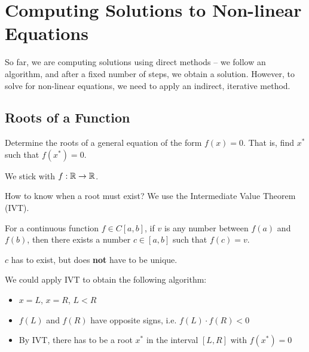 \chapter{Computing Solutions to Non-linear Equations}

So far, we are computing solutions using direct methods -- we follow an algorithm, and after a fixed number of steps, we obtain a solution. However, to solve for non-linear equations, we need to apply an indirect, iterative method.

\section{Roots of a Function}

Determine the roots of a general equation of the form \( f(x) = 0 \). That is, find \( x^\ast \) such that \( f(x^\ast) = 0 \).

\begin{note}
    We stick with \( f: \mathbb{R} \to \mathbb{R} \).
\end{note}

How to know when a root must exist? We use the Intermediate Value Theorem (IVT).

\begin{theorem}
    For a continuous function \( f \in C[a, b] \), if \( v \) is any number between \( f(a) \) and \( f(b) \), then there exists a number \( c \in [a, b] \) such that \( f(c) = v \).
\end{theorem}

\begin{remark}
    \( c \) has to exist, but does \textbf{not} have to be unique.
\end{remark}

We could apply IVT to obtain the following algorithm:
\begin{itemize}
    \item \( x = L \), \( x = R \), \( L < R \)
    \item \( f(L) \) and \( f(R) \) have opposite signs, i.e. \( f(L) \cdot f(R) < 0 \)
    \item By IVT, there has to be a root \( x^\ast \) in the interval \( [L, R] \) with \( f(x^\ast) = 0 \)
\end{itemize}

